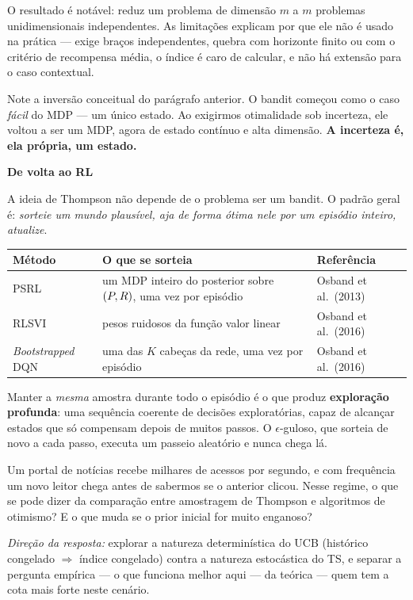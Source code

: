 \documentclass[11pt, a4paper]{article}
\newcommand{\subt}[1]{\medskip\noindent\textbf{\color{rlAzulClaro}#1}\par\nobreak\smallskip}
\begin{document}
O resultado é notável: reduz um problema de dimensão $m$ a $m$ problemas
unidimensionais independentes. As limitações explicam por que ele não é usado
na prática — exige braços independentes, quebra com horizonte finito ou com o
critério de recompensa média, o índice é caro de calcular, e não há extensão
para o caso contextual.

\begin{ideiabox}
Note a inversão conceitual do parágrafo anterior. O bandit começou como o caso
\emph{fácil} do MDP — um único estado. Ao exigirmos otimalidade sob incerteza,
ele voltou a ser um MDP, agora de estado contínuo e alta dimensão.
\textbf{A incerteza é, ela própria, um estado.}
\end{ideiabox}

\subt{De volta ao RL}
A ideia de Thompson não depende de o problema ser um bandit. O padrão geral é:
\emph{sorteie um mundo plausível, aja de forma ótima nele por um episódio
inteiro, atualize}.

\begin{center}\small
\begin{tabular}{@{}lp{7.0cm}l@{}}
\toprule
\textbf{Método} & \textbf{O que se sorteia} & \textbf{Referência} \\
\midrule
PSRL & um MDP inteiro do posterior sobre $(P,R)$, uma vez por episódio & Osband et al.\ (2013) \\
RLSVI & pesos ruidosos da função valor linear & Osband et al.\ (2016) \\
\emph{Bootstrapped} DQN & uma das $K$ cabeças da rede, uma vez por episódio & Osband et al.\ (2016) \\
\bottomrule
\end{tabular}
\end{center}

\medskip
\noindent
Manter a \emph{mesma} amostra durante todo o episódio é o que produz
\textbf{exploração profunda}: uma sequência coerente de decisões exploratórias,
capaz de alcançar estados que só compensam depois de muitos passos. O
$\epsilon$-guloso, que sorteia de novo a cada passo, executa um passeio
aleatório e nunca chega lá.

\begin{discbox}
Um portal de notícias recebe milhares de acessos por segundo, e com frequência
um novo leitor chega antes de sabermos se o anterior clicou. Nesse regime, o que
se pode dizer da comparação entre amostragem de Thompson e algoritmos de
otimismo? E o que muda se o prior inicial for muito enganoso?

\smallskip
{\footnotesize\color{rlCinza}\emph{Direção da resposta:} explorar a natureza
determinística do UCB (histórico congelado $\Rightarrow$ índice congelado)
contra a natureza estocástica do TS, e separar a pergunta empírica — o que
funciona melhor aqui — da teórica — quem tem a cota mais forte neste cenário.}
\end{discbox}
\end{document}
